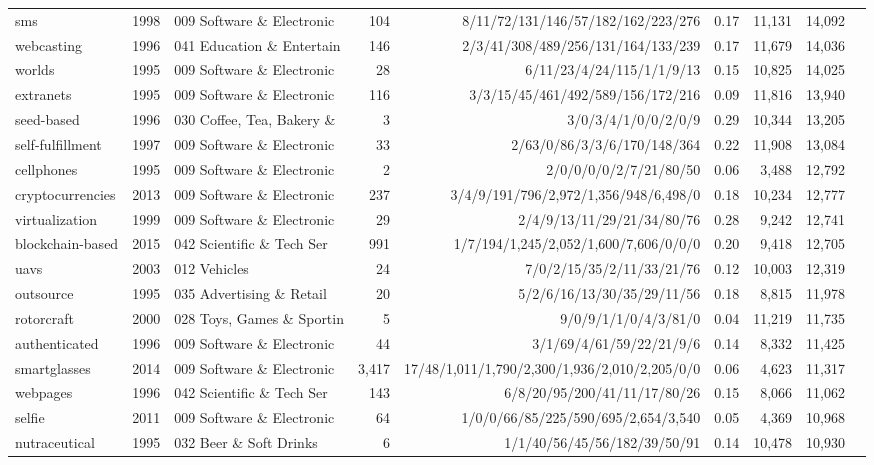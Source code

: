 {\begin{tabular}{llp{3.2cm}rrp{3.4cm}rrr}
sms & 1998 & 009 Software \& Electronic & 104 & 8/11/72/131/146/57/182/162/223/276 & 0.17 & 11,131 & 14,092 \\
webcasting & 1996 & 041 Education \& Entertain & 146 & 2/3/41/308/489/256/131/164/133/239 & 0.17 & 11,679 & 14,036 \\
worlds & 1995 & 009 Software \& Electronic & 28 & 6/11/23/4/24/115/1/1/9/13 & 0.15 & 10,825 & 14,025 \\
extranets & 1995 & 009 Software \& Electronic & 116 & 3/3/15/45/461/492/589/156/172/216 & 0.09 & 11,816 & 13,940 \\
seed-based & 1996 & 030 Coffee, Tea, Bakery \& & 3 & 3/0/3/4/1/0/0/2/0/9 & 0.29 & 10,344 & 13,205 \\
self-fulfillment & 1997 & 009 Software \& Electronic & 33 & 2/63/0/86/3/3/6/170/148/364 & 0.22 & 11,908 & 13,084 \\
cellphones & 1995 & 009 Software \& Electronic & 2 & 2/0/0/0/0/2/7/21/80/50 & 0.06 & 3,488 & 12,792 \\
cryptocurrencies & 2013 & 009 Software \& Electronic & 237 & 3/4/9/191/796/2,972/1,356/948/6,498/0 & 0.18 & 10,234 & 12,777 \\
virtualization & 1999 & 009 Software \& Electronic & 29 & 2/4/9/13/11/29/21/34/80/76 & 0.28 & 9,242 & 12,741 \\
blockchain-based & 2015 & 042 Scientific \& Tech Ser & 991 & 1/7/194/1,245/2,052/1,600/7,606/0/0/0 & 0.20 & 9,418 & 12,705 \\
uavs & 2003 & 012 Vehicles & 24 & 7/0/2/15/35/2/11/33/21/76 & 0.12 & 10,003 & 12,319 \\
outsource & 1995 & 035 Advertising \& Retail & 20 & 5/2/6/16/13/30/35/29/11/56 & 0.18 & 8,815 & 11,978 \\
rotorcraft & 2000 & 028 Toys, Games \& Sportin & 5 & 9/0/9/1/1/0/4/3/81/0 & 0.04 & 11,219 & 11,735 \\
authenticated & 1996 & 009 Software \& Electronic & 44 & 3/1/69/4/61/59/22/21/9/6 & 0.14 & 8,332 & 11,425 \\
smartglasses & 2014 & 009 Software \& Electronic & 3,417 & 17/48/1,011/1,790/2,300/1,936/2,010/2,205/0/0 & 0.06 & 4,623 & 11,317 \\
webpages & 1996 & 042 Scientific \& Tech Ser & 143 & 6/8/20/95/200/41/11/17/80/26 & 0.15 & 8,066 & 11,062 \\
selfie & 2011 & 009 Software \& Electronic & 64 & 1/0/0/66/85/225/590/695/2,654/3,540 & 0.05 & 4,369 & 10,968 \\
nutraceutical & 1995 & 032 Beer \& Soft Drinks & 6 & 1/1/40/56/45/56/182/39/50/91 & 0.14 & 10,478 & 10,930 \\

\end{tabular}}
